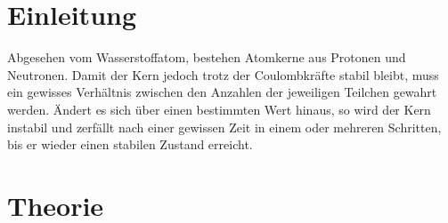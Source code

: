 
	\section{Einleitung}				%
Abgesehen vom Wasserstoffatom, bestehen Atomkerne aus Protonen und Neutronen. Damit der Kern jedoch trotz der Coulombkräfte stabil bleibt, muss ein gewisses Verhältnis zwischen den Anzahlen der jeweiligen Teilchen gewahrt werden. Ändert es sich über einen bestimmten Wert hinaus, so wird der Kern instabil und zerfällt nach einer gewissen Zeit in einem oder mehreren Schritten, bis er wieder einen stabilen Zustand erreicht.
	\section{Theorie}
